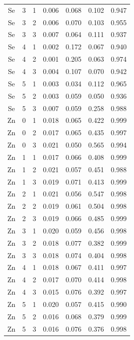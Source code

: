 \documentclass[ms, hidelinks]{uncgdissertationexp3}
\theoremstyle{plain}
\theoremstyle{definition}
\theoremstyle{remark}
\begin{document}
\begin{longtable}{ccccccc}
  Se & 3 & 1 & 0.006 & 0.068 & 0.102 & 0.947\\
  \rowcolor{gray!6}  Se & 3 & 2 & 0.006 & 0.070 & 0.103 & 0.955\\
  Se & 3 & 3 & 0.007 & 0.064 & 0.111 & 0.937\\
  \rowcolor{gray!6}  Se & 4 & 1 & 0.002 & 0.172 & 0.067 & 0.940\\
  Se & 4 & 2 & 0.001 & 0.205 & 0.063 & 0.974\\
  \rowcolor{gray!6}  Se & 4 & 3 & 0.004 & 0.107 & 0.070 & 0.942\\
  Se & 5 & 1 & 0.003 & 0.034 & 0.112 & 0.965\\
  \rowcolor{gray!6}  Se & 5 & 2 & 0.003 & 0.059 & 0.050 & 0.936\\
  Se & 5 & 3 & 0.007 & 0.059 & 0.258 & 0.988\\
  \rowcolor{gray!6}  Zn & 0 & 1 & 0.018 & 0.065 & 0.422 & 0.999\\
  Zn & 0 & 2 & 0.017 & 0.065 & 0.435 & 0.997\\
  \rowcolor{gray!6}  Zn & 0 & 3 & 0.021 & 0.050 & 0.565 & 0.994\\
  Zn & 1 & 1 & 0.017 & 0.066 & 0.408 & 0.999\\
  \rowcolor{gray!6}  Zn & 1 & 2 & 0.021 & 0.057 & 0.451 & 0.988\\
  Zn & 1 & 3 & 0.019 & 0.071 & 0.413 & 0.999\\
  \rowcolor{gray!6}  Zn & 2 & 1 & 0.021 & 0.056 & 0.547 & 0.998\\
  Zn & 2 & 2 & 0.019 & 0.061 & 0.504 & 0.998\\
  \rowcolor{gray!6}  Zn & 2 & 3 & 0.019 & 0.066 & 0.485 & 0.999\\
  Zn & 3 & 1 & 0.020 & 0.059 & 0.456 & 0.998\\
  \rowcolor{gray!6}  Zn & 3 & 2 & 0.018 & 0.077 & 0.382 & 0.999\\
  Zn & 3 & 3 & 0.018 & 0.074 & 0.404 & 0.998\\
  \rowcolor{gray!6}  Zn & 4 & 1 & 0.018 & 0.067 & 0.411 & 0.997\\
  Zn & 4 & 2 & 0.017 & 0.070 & 0.414 & 0.998\\
  \rowcolor{gray!6}  Zn & 4 & 3 & 0.015 & 0.076 & 0.392 & 0.997\\
  Zn & 5 & 1 & 0.020 & 0.057 & 0.415 & 0.990\\
  \rowcolor{gray!6}  Zn & 5 & 2 & 0.016 & 0.068 & 0.379 & 0.999\\
  Zn & 5 & 3 & 0.016 & 0.076 & 0.376 & 0.998\\*
  \end{longtable}
\end{document}
